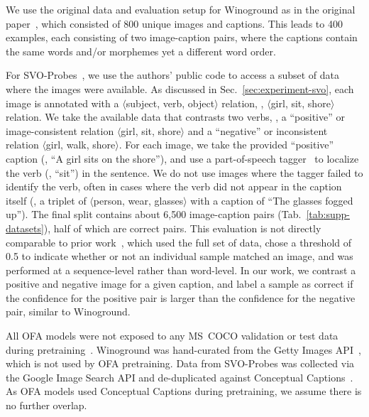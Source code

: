 \documentclass[10pt,twocolumn,letterpaper]{article}
\newcommand{\tabref}[1]{Tab.\xspace~\ref{#1}}
\newcommand{\secref}[1]{Sec.\xspace~\ref{#1}}
\newcommand{\minisection}[1]{\noindent{\textbf{#1.}}}
\begin{document}
\minisection{Winoground} We use the original data and evaluation setup for Winoground as in the original paper~\cite{thrush_and_ross2022winoground}, which consisted of 800 unique images and captions. This leads to 400 examples, each consisting of two image-caption pairs, where the captions contain the same words and/or morphemes yet a different word order.

\minisection{SVO-Probes} For SVO-Probes~\cite{hendricks2021probing}, we use the authors' public code to access a subset of data where the images were available. As discussed in \secref{sec:experiment-svo}, each image is annotated with a  $\langle$subject, verb, object$\rangle$ relation, \eg,  $\langle$girl, sit, shore$\rangle$ relation. We take the available data that contrasts two verbs, \eg, a ``positive'' or image-consistent relation $\langle$girl, sit, shore$\rangle$ and a ``negative'' or inconsistent relation $\langle$girl, walk, shore$\rangle$. For each image, we take the provided ``positive'' caption (\eg, ``A girl sits on the shore''), and use a part-of-speech tagger~\cite{spacy} to localize the verb (\eg, ``sit'') in the sentence. We do not use images where the tagger failed to identify the verb, often in cases where the verb did not appear in the caption itself (\eg,  a triplet of $\langle$person, wear, glasses$\rangle$ with a caption of ``The glasses fogged up''). The final split contains about 6,500 image-caption pairs (\tabref{tab:supp-datasets}), half of which are correct pairs. This evaluation is not directly comparable to prior work~\cite{hendricks2021probing}, which used the full set of data, chose a threshold of 0.5 to indicate whether or not an individual sample matched an image, and was performed at a sequence-level rather than word-level. In our work, we contrast a positive and negative image for a given caption, and label a sample as correct if the confidence for the positive pair is larger than the confidence for the negative pair, similar to Winoground.

\minisection{Overlap with training data} All OFA models were not exposed to any MS~COCO validation or test data during pretraining~\cite{ofa}. Winoground was hand-curated from the Getty Images API~\cite{getty,thrush_and_ross2022winoground}, which is not used by OFA pretraining. Data from SVO-Probes was collected via the Google Image Search API and de-duplicated against Conceptual Captions~\cite{hendricks2021probing,sharma2018conceptual}. As OFA models used Conceptual Captions during pretraining, we assume there is no further overlap. 
\end{document}
